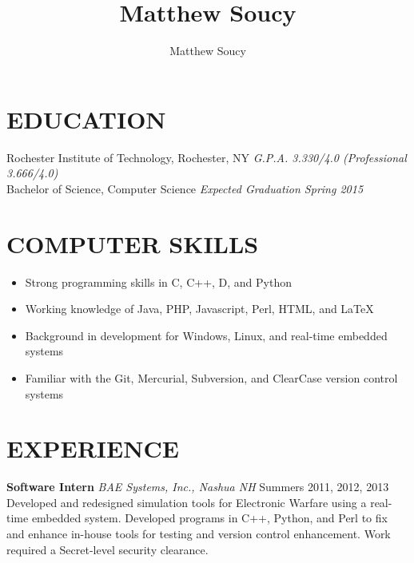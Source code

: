 \documentclass[line]{res}
\author{Matthew Soucy}
\title{Matthew Soucy}
\begin{document}
\setlength{\textheight}{11.5in} %
\address{\large
		2433 Nathaniel Rochester Hall
		\\
		Rochester, NY 14623
		\\
		(585) 204-7402}
\address{\large
		http://msoucy.me/
		\\
		http://linkedin.com/in/msoucy}

\begin{resume}

\section{EDUCATION}

	Rochester Institute of Technology, Rochester, NY
	\hfill
	\textit{G.P.A. 3.330/4.0 (Professional 3.666/4.0)}
	\\
	Bachelor of Science, Computer Science
	\hfill
	\textit{Expected Graduation Spring 2015}

\section{COMPUTER SKILLS}

	\begin{itemize}[leftmargin=10pt]
	\item Strong programming skills in C, C++, D, and Python
	\item Working knowledge of Java, PHP, Javascript, Perl, HTML, and LaTeX
	\item Background in development for Windows, Linux, and real-time embedded systems
	\item Familiar with the Git, Mercurial, Subversion, and ClearCase version control systems
	\end{itemize}

\section{EXPERIENCE}

	\textbf{Software Intern}
	\textit{BAE Systems, Inc., Nashua NH}
	\hfill
	Summers 2011, 2012, 2013\\
	Developed and redesigned simulation tools for Electronic Warfare using a real-time embedded system.
	Developed programs in C++, Python, and Perl to fix and enhance in-house tools for testing and version control enhancement.
	Work required a Secret-level security clearance.


\end{resume}
\end{document}
